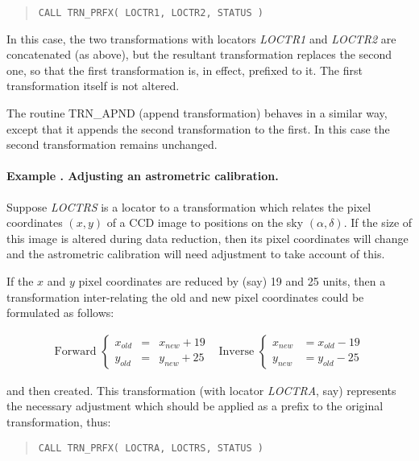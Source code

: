 \documentclass[twoside,11pt]{article}
\newcommand{\name}[1]{\mbox{\small{#1}}}
\newcommand{\fortvar}[1]{\mbox{\emph{#1}}}
\newcounter{examplecounter}
\newcommand{\example}[1]{\addtocounter{examplecounter}{1}
                         \paragraph{\textbf{Example \theexamplecounter. #1}}}
\begin{document}
\begin{quote}
\begin{verbatim}
CALL TRN_PRFX( LOCTR1, LOCTR2, STATUS )
\end{verbatim}
\end{quote}

In this case, the two transformations with locators \fortvar{LOCTR1} and
\fortvar{LOCTR2} are concatenated (as above), but the resultant
transformation replaces the second one, so that the first transformation is,
in effect, prefixed to it. 
The first transformation itself is not altered.

The routine \name{TRN\_APND} (append transformation) behaves in a similar
way, except that it appends the second transformation to the first. In this
case the second transformation remains unchanged. 

\example{Adjusting an astrometric calibration.}
Suppose \fortvar{LOCTRS} is a locator to a transformation which relates the
pixel coordinates \mbox{$(x,y)$} of a \name{CCD} image to positions on the
sky \mbox{$(\alpha,\delta)$}. 
If the size of this image is altered during data reduction, then its pixel
coordinates will change and the astrometric calibration will need adjustment
to take account of this. 

If the $x$ and $y$ pixel coordinates are reduced by (say) 19 and 25 units,
then a transformation inter-relating the old and new pixel coordinates could
be formulated as follows: 

\begin{equation}
\begin{array}{cc}

\mbox{Forward } \left\{
\begin{array}{lll}
x_{old} & = & x_{new} + 19 \\
y_{old} & = & y_{new} + 25
\end{array}
\right.
&
\mbox{Inverse } \left\{
\begin{array}{lll}
x_{new} & = x_{old} - 19 \\
y_{new} & = y_{old} - 25
\end{array}
\right.

\end{array}
\end{equation}

and then created.
This transformation (with locator \fortvar{LOCTRA}, say) represents the
necessary adjustment which should be applied as a prefix to the original
transformation, thus: 

\begin{quote}
\begin{verbatim}
CALL TRN_PRFX( LOCTRA, LOCTRS, STATUS )
\end{verbatim}
\end{quote}
\end{document}
